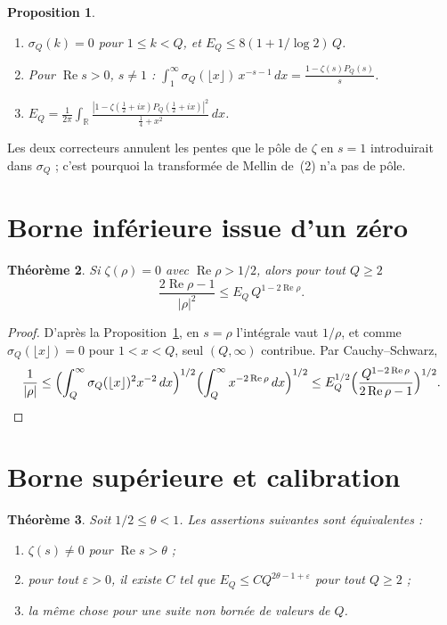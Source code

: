 \documentclass[11pt,a4paper]{amsart}
\newtheorem{teorema}{Th\'eor\`eme}
\newtheorem{proposicion}[teorema]{Proposition}
\theoremstyle{definition}
\theoremstyle{remark}
\renewcommand{\Re}{\operatorname{Re}}
\begin{document}
\begin{proposicion}\label{prop:mellin}
\begin{enumerate}
\item $\sigma_Q(k)=0$ pour $1\le k<Q$, et $E_Q\le 8(1+1/\log2)\,Q$.
\item Pour $\Re s>0$, $s\ne1$ : $\displaystyle\int_1^\infty\sigma_Q(\lfloor x\rfloor)\,x^{-s-1}\,dx=\frac{1-\zeta(s)P_Q(s)}{s}$.
\item $\displaystyle E_Q=\frac1{2\pi}\int_{\mathbb R}\frac{|1-\zeta(\tfrac12+ix)P_Q(\tfrac12+ix)|^2}{\tfrac14+x^2}\,dx$.
\end{enumerate}
\end{proposicion}

Les deux correcteurs annulent les pentes que le p\^ole de $\zeta$ en $s=1$ introduirait dans $\sigma_Q$ ; c'est pourquoi la transform\'ee de Mellin de~(2) n'a pas de p\^ole.

\section{Borne inf\'erieure issue d'un z\'ero}

\begin{teorema}\label{teo:recip}
Si $\zeta(\rho)=0$ avec $\Re\rho>1/2$, alors pour tout $Q\ge2$
\[
\frac{2\Re\rho-1}{|\rho|^2}\le E_Q\,Q^{1-2\Re\rho}.
\]
\end{teorema}

\begin{proof}
D'apr\`es la Proposition~\ref{prop:mellin}, en $s=\rho$ l'int\'egrale vaut $1/\rho$, et comme $\sigma_Q(\lfloor x\rfloor)=0$ pour $1<x<Q$, seul $(Q,\infty)$ contribue. Par Cauchy--Schwarz,
\[
\frac1{|\rho|}\le\Bigl(\int_Q^\infty\sigma_Q(\lfloor x\rfloor)^2x^{-2}\,dx\Bigr)^{1/2}\Bigl(\int_Q^\infty x^{-2\Re\rho}\,dx\Bigr)^{1/2}
\le E_Q^{1/2}\Bigl(\frac{Q^{1-2\Re\rho}}{2\Re\rho-1}\Bigr)^{1/2}.\qedhere
\]
\end{proof}

\section{Borne sup\'erieure et calibration}\label{sec:cotas}

\begin{teorema}\label{teo:theta}
Soit $1/2\le\theta<1$. Les assertions suivantes sont \'equivalentes :
\begin{enumerate}
\item $\zeta(s)\ne0$ pour $\Re s>\theta$ ;
\item pour tout $\varepsilon>0$, il existe $C$ tel que $E_Q\le CQ^{2\theta-1+\varepsilon}$ pour tout $Q\ge2$ ;
\item la m\^eme chose pour une suite non born\'ee de valeurs de $Q$.
\end{enumerate}
\end{teorema}
\end{document}
